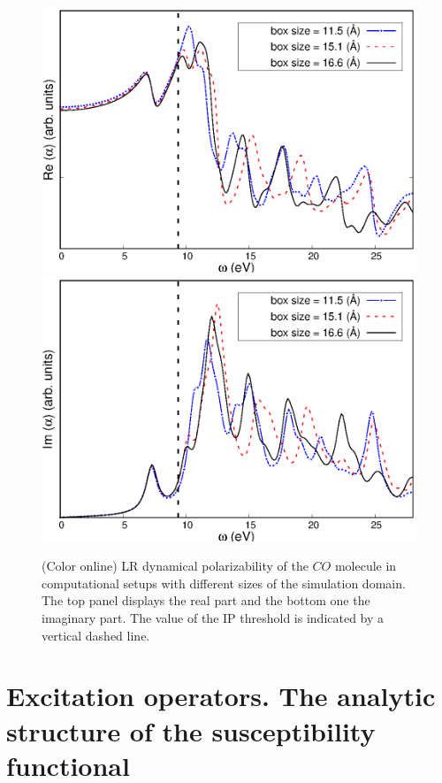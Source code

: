 \documentclass[reprint,aps,prb]{revtex4-1}
\begin{document}
\begin{figure}
\centering
\subfloat
{\includegraphics[scale=0.56]{Fig2a_CO_AlphaOmegaReal.eps}} \\
\centering
\subfloat
{\includegraphics[scale=0.58]{Fig2b_CO_spectrum.eps}}
\caption{\label{co_spectrum}(Color online) LR dynamical polarizability of the $CO$ molecule in computational setups with different
sizes of the simulation domain. The top panel displays the real part and the bottom one the imaginary part. The value of the IP threshold
is indicated by a vertical dashed line.}
\end{figure}

\section{Excitation operators. The analytic structure of the susceptibility functional}
\end{document}
